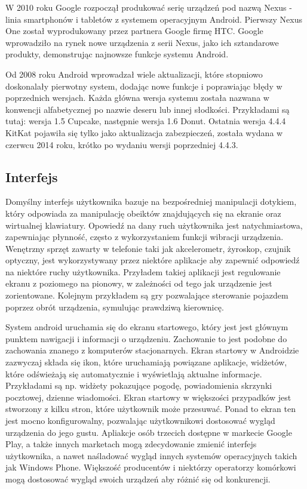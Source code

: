 W 2010 roku Google rozpoczął produkować serię urządzeń pod nazwą Nexus - linia smartphonów i tabletów z systemem operacyjnym Android. Pierwszy Nexus One został wyprodukowany przez partnera Google firmę HTC.\cite{android:20} Google wprowadziło na rynek nowe urządzenia z serii Nexus, jako ich sztandarowe produkty, demonstrując najnowsze funkcje systemu Android.

Od 2008 roku Android wprowadzał wiele aktualizacji, które stopniowo doskonalały pierwotny system, dodając nowe funkcje i poprawiając błędy w poprzednich wersjach. Każda główna wersja systemu została nazwana w konwencji alfabetycznej po nazwie deseru lub innej słodkości. Przykładami są tutaj: wersja 1.5 Cupcake, następnie wersja 1.6 Donut. Ostatnia wersja 4.4.4 KitKat pojawiła się tylko jako aktualizacja zabezpieczeń, została wydana w czerwcu 2014 roku, krótko po wydaniu wersji poprzedniej 4.4.3.\cite{android:21}\cite{android:22}\cite{android:23}

\subsection{Interfejs}

Domyślny interfejs użytkownika bazuje na bezpośredniej manipulacji\cite{android:24} dotykiem, który odpowiada za manipulację obeiktów znajdujących się na ekranie oraz wirtualnej klawiatury. \cite{android:24} Opowiedź na dany ruch użytkownika jest natychmiastowa, zapewniając płynność, często z wykorzystaniem funkcji wibracji urządzenia. Wenętrzny sprzęt zawarty w telefonie taki jak akcelerometr, żyroskop, czujnik optyczny, jest wykorzystywany przez niektóre aplikacje aby zapewnić odpowiedź na niektóre ruchy użytkownika.\cite{android:25} Przyładem takiej aplikacji jest regulowanie ekranu z poziomego na pionowy, w zależności od tego jak urządzenie jest zorientowane. Kolejnym przykładem są gry pozwalające sterowanie pojazdem poprzez obrót urządzenia, symulując prawdziwą kierownicę.\cite{android:26}

System android uruchamia się do ekranu startowego, który jest jest głównym punktem nawigacji i informacji o urządzeniu. Zachowanie to jest podobne do zachowania znanego z komputerów stacjonarnych. Ekran startowy w Androidzie zazwyczaj składa się ikon, które uruchamiają powiązane aplikacje, widżetów, które odświeżają się automatycznie i wyświetlają aktualne informacje. Przykładami są np. widżety pokazujące pogodę, powiadomienia skrzynki pocztowej, dzienne wiadomości.\cite{android:27} Ekran startowy w większości przypadków jest stworzony z kilku stron, które użytkownik może przesuwać. Ponad to ekran ten jest mocno konfigurowalny, pozwalając użytkownikowi dostosować wygląd urządzenia do jego gustu.\cite{android:28} Apliakcje osób trzecich dostępne w markecie Google Play, a także innych marketach mogą zdecydowanie zmienić interfejs użytkownika, a nawet naśladować wygląd innych systemów operacyjnych takich jak Windows Phone.\cite{android:29} Większość producentów i niektórzy operatorzy komórkowi mogą dostosować wygląd swoich urządzeń aby różnić się od konkurencji. \cite{android:30}

